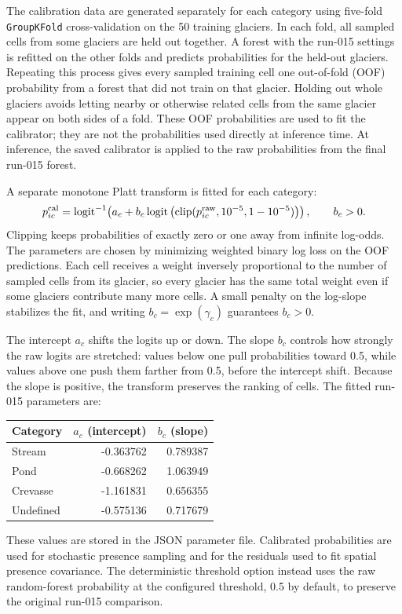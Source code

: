 \documentclass[11pt,a4paper]{article}
\begin{document}
The calibration data are generated separately for each category using five-fold
\texttt{GroupKFold} cross-validation on the 50 training glaciers. In each fold,
all sampled cells from some glaciers are held out together. A forest with the
run-015 settings is refitted on the other folds and predicts probabilities for
the held-out glaciers. Repeating this process gives every sampled training cell
one out-of-fold (OOF) probability from a forest that did not train on that
glacier. Holding out whole glaciers avoids letting nearby or otherwise related
cells from the same glacier appear on both sides of a fold. These OOF
probabilities are used to fit the calibrator; they are not the probabilities
used directly at inference time. At inference, the saved calibrator is applied
to the raw probabilities from the final run-015 forest.

A separate monotone Platt transform is fitted for each category:
\[
 p_{ic}^{\rm cal} =
 \operatorname{logit}^{-1}\!\left(a_c+b_c\operatorname{logit}
 \left(\operatorname{clip}(p_{ic}^{\rm raw},10^{-5},1-10^{-5})\right)\right),
 \qquad b_c>0.
\]
Clipping keeps probabilities of exactly zero or one away from infinite
log-odds. The parameters are chosen by minimizing weighted binary log loss on
the OOF predictions. Each cell receives a weight inversely proportional to the
number of sampled cells from its glacier, so every glacier has the same total
weight even if some glaciers contribute many more cells. A small penalty on the
log-slope stabilizes the fit, and writing $b_c=\exp(\gamma_c)$ guarantees
$b_c>0$.

The intercept $a_c$ shifts the logits up or down. The slope $b_c$ controls how
strongly the raw logits are stretched: values below one pull probabilities
toward 0.5, while values above one push them farther from 0.5, before the
intercept shift. Because the slope is positive, the transform preserves the
ranking of cells. The fitted run-015 parameters are:
\begin{center}
\begin{tabular}{lrr}
\toprule
Category & $a_c$ (intercept) & $b_c$ (slope)\\
\midrule
Stream & -0.363762 & 0.789387\\
Pond & -0.668262 & 1.063949\\
Crevasse & -1.161831 & 0.656355\\
Undefined & -0.575136 & 0.717679\\
\bottomrule
\end{tabular}
\end{center}
These values are stored in the JSON parameter file. Calibrated probabilities
are used for stochastic presence sampling and for the residuals used to fit
spatial presence covariance. The deterministic threshold option instead uses
the raw random-forest probability at the configured threshold, 0.5 by default,
to preserve the original run-015 comparison.
\end{document}
